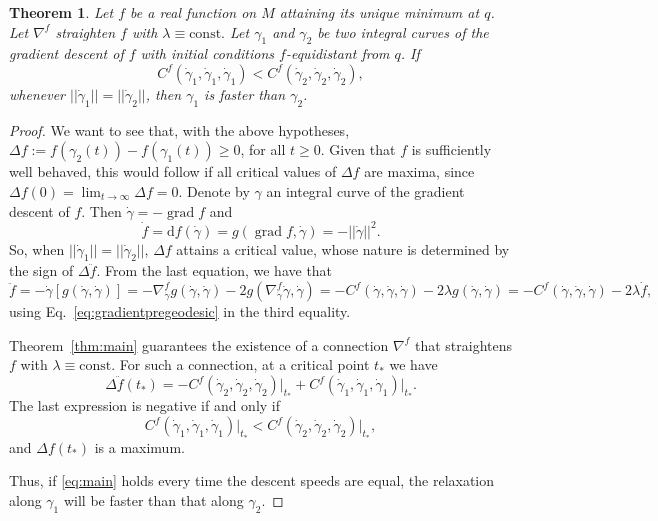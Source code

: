 \documentclass[10pt,a4paper]{amsart}
\newtheorem{theorem}{Theorem}
\begin{document}
\begin{theorem}\label{thm:asymmetric}
     Let $f$ be a real function on $M$ attaining its unique
     minimum at $q$. Let $\nabla^f$ straighten $f$ with $\lambda\equiv\text{const.}$ 
     Let $\gamma_1$ and $\gamma_2$ be two integral curves of the gradient descent of $f$ 
     with initial conditions $f$-equidistant from $q$.
    If 
    \begin{equation}
        C^f(\dot\gamma_1,\dot\gamma_1,\dot\gamma_1)<C^f (\dot\gamma_2,\dot\gamma_2,\dot\gamma_2),
    \end{equation}
    whenever $||\dot\gamma_1||=||\dot\gamma_2||$,
    then $\gamma_1$ is faster than $\gamma_2$.
\end{theorem}

\begin{proof}
    We want to see that, with the above hypotheses, $\Delta f:=f(\gamma_2(t))-f(\gamma_1(t))\geq0$, for all $t\geq 0$. Given that $f$ is sufficiently well behaved, this would follow if all critical values of $\Delta f$ are maxima, since $\Delta f(0)=\lim_{t\to\infty}\Delta f=0$. 
    Denote by $\gamma$ an integral curve of the gradient descent of $f$. Then $\dot\gamma=-\operatorname{grad}f$ and
    \begin{equation}\label{eq:fdot}
        \dot f=\mathrm{d}f(\dot\gamma)=g(\operatorname{grad}f,\dot\gamma)=-||\dot\gamma||^2.
    \end{equation}
    So, when $||\dot\gamma_1||=||\dot\gamma_2||$, $\Delta f$ attains a critical value, whose nature is determined by the sign of $\Delta\ddot f.$
    From the last equation, we have that
    \begin{equation}
        \ddot f=-\dot\gamma[g(\dot\gamma,\dot\gamma)]=-\nabla^f_{\dot\gamma}g (\dot\gamma,\dot\gamma)-2g(\nabla^f_{\dot\gamma}\dot\gamma,\dot\gamma)=-C^f(\dot\gamma,\dot\gamma,\dot\gamma)-2\lambda g(\dot\gamma,\dot\gamma)=-C^f(\dot\gamma,\dot\gamma,\dot\gamma)-2\lambda \dot f,\label{eq:ddotf}
    \end{equation}
    using Eq.~\eqref{eq:gradientpregeodesic} in the third equality. 
    
    Theorem~\ref{thm:main} guarantees the existence of a connection $\nabla^f$ that straightens $f$ with $\lambda\equiv\text{const.}$ For such a connection, at a critical point $t_*$ we have
    \begin{equation}
    \Delta \ddot f(t_*)=-C^f(\dot\gamma_2, \dot\gamma_2,\dot\gamma_2)\vert_{t_*}+C^f(\dot\gamma_1,\dot\gamma_1,\dot\gamma_1)\vert_{t_*}.
    \end{equation}
    The last expression is negative if and only if
    \begin{equation}
        C^f(\dot\gamma_1,\dot\gamma_1,\dot\gamma_1)\vert_{t_*}<C^f(\dot\gamma_2,\dot\gamma_2,\dot\gamma_2)\vert_{t_*},\label{eq:main}
    \end{equation}
    and $\Delta f(t_*)$ is a maximum.
    
    Thus, if \eqref{eq:main} holds every time the descent speeds are equal, the relaxation along $\gamma_1$ will be faster than that along $\gamma_2$.

\end{proof}
\end{document}
